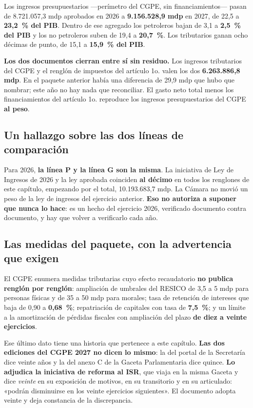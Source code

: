 

Los ingresos presupuestarios ---perímetro del CGPE, sin financiamientos--- pasan de
8.721.057,3 mdp aprobados en 2026 a \textbf{9.156.528,9 mdp} en 2027, de 22,5 a
\textbf{23,2~\% del PIB}. Dentro de ese agregado los petroleros bajan de 3,1 a
\textbf{2,5~\% del PIB} y los no petroleros suben de 19,4 a \textbf{20,7~\%}. Los
tributarios ganan ocho décimas de punto, de 15,1 a \textbf{15,9~\% del PIB}.

\textbf{Los dos documentos cierran entre sí sin residuo.} Los ingresos tributarios del CGPE
y el renglón de impuestos del artículo 1o. valen los dos \textbf{6.263.886,8 mdp}. En el
paquete anterior había una diferencia de 29,9 mdp que hubo que nombrar; este año no hay
nada que reconciliar. El gasto neto total menos los financiamientos del artículo 1o.
reproduce los ingresos presupuestarios del CGPE \textbf{al peso}.

\subsection*{Un hallazgo sobre las dos líneas de comparación}

Para 2026, \textbf{la línea P y la línea G son la misma}. La iniciativa de Ley de Ingresos
de 2026 y la ley aprobada coinciden \textbf{al décimo} en todos los renglones de este
capítulo, empezando por el total, 10.193.683,7 mdp. La Cámara no movió un peso de la ley de
ingresos del ejercicio anterior. \textbf{Eso no autoriza a suponer que nunca lo hace}: es un
hecho del ejercicio 2026, verificado documento contra documento, y hay que volver a
verificarlo cada año.

\subsection*{Las medidas del paquete, con la advertencia que exigen}

El CGPE enumera medidas tributarias cuyo efecto recaudatorio \textbf{no publica renglón por
renglón}: ampliación de umbrales del RESICO de 3,5 a 5 mdp para personas físicas y de 35 a
50 mdp para morales; tasa de retención de intereses que baja de 0,90 a \textbf{0,68~\%};
repatriación de capitales con tasa de \textbf{7,5~\%}; y un límite a la amortización de
pérdidas fiscales con ampliación del plazo \textbf{de diez a veinte ejercicios}.

Ese último dato tiene una historia que pertenece a este capítulo. \textbf{Las dos ediciones
del CGPE 2027 no dicen lo mismo}: la del portal de la Secretaría dice veinte años y la del
anexo C de la Gaceta Parlamentaria dice quince. \textbf{Lo adjudica la iniciativa de reforma
al ISR}, que viaja en la misma Gaceta y dice \emph{veinte} en su exposición de motivos, en
su transitorio y en su articulado: «podrán disminuirse en los veinte ejercicios
siguientes». El documento adopta veinte y deja constancia de la discrepancia.

